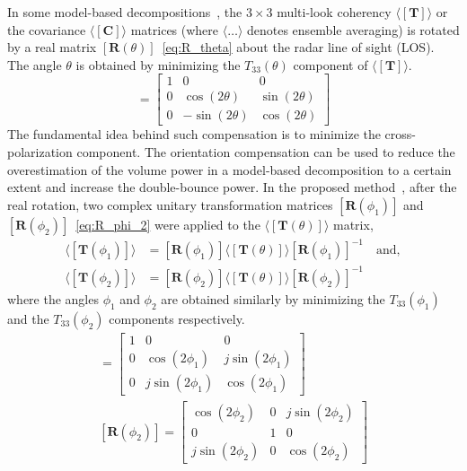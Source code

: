 In some model-based decompositions~\cite{Arii11,An10,YAMAGUCHI2011,Lee2011,singh13,Chen14,Bhattacharya15_SD_Y4O}, the $3\times3$ multi-look coherency $\mathbf{\langle[T]\rangle}$ or the covariance $\mathbf{\langle[C]\rangle}$ matrices (where $\langle\dots\rangle$ denotes ensemble averaging) is rotated by a real matrix $[{\mathbf{R}}(\theta)]$~\eqref{eq:R_theta} about the radar line of sight (LOS). The angle $\theta$ is obtained by minimizing the $T_{33}(\theta)$ component of $\mathbf{\langle[T]\rangle}$. 
\begin{equation}
[{\mathbf{R}}(\theta)] = \left[ \begin{array}{ccc}
1 &0 & 0 \\
0 & \cos(2\theta) & \sin(2\theta) \\
0 & -\sin(2\theta) & \cos(2\theta)
\end{array}\right] 
\label{eq:R_theta} 
\end{equation}
The fundamental idea behind such compensation is to minimize the cross-polarization component. The orientation compensation can be used to reduce the overestimation of the volume power in a model-based decomposition to a certain extent and increase the double-bounce power. 
In the proposed method~\cite{Bhattacharya15}, after the real rotation, two complex unitary transformation matrices $[{\mathbf{R}}(\phi_1)]$ and $[{\mathbf{R}}(\phi_2)]$~\eqref{eq:R_phi_2} were applied to the $\langle[{\mathbf{T}}(\theta)]\rangle$ matrix,
\begin{align*}
\langle[{\mathbf{T}}(\phi_1)]\rangle&=[{\mathbf{R}}(\phi_1)]\langle[{\mathbf{T}}(\theta)]\rangle[{\mathbf{R}}(\phi_1)]^{-1} \quad \mbox{and},\\[0.4em] 
\langle[{\mathbf{T}}(\phi_2)]\rangle&=[{\mathbf{R}}(\phi_2)]\langle[{\mathbf{T}}(\theta)]\rangle[{\mathbf{R}}(\phi_2)]^{-1}
\end{align*}
where the angles $\phi_{1}$ and $\phi_{2}$ are obtained similarly by minimizing the  $T_{33}(\phi_{1})$ and the $T_{33}(\phi_{2})$ components respectively. 
\begin{gather}
[{\mathbf{R}}(\phi_1)] = \left[ \begin{array}{ccc}
1 & 0 & 0 \\
0 & \cos(2\phi_1) & j\sin(2\phi_1) \\
0 & j\sin(2\phi_1) & \cos(2\phi_1)
\end{array}\right] \label{eq:R_phi_1} \\[0.5em] 
[{\mathbf{R}}(\phi_2)] = \left[ \begin{array}{ccc}
\cos(2\phi_2) & 0 & j\sin(2\phi_2) \\
0 & 1 & 0 \\
j\sin(2\phi_2) & 0 & \cos(2\phi_2)
\end{array}\right] 
\label{eq:R_phi_2}
\end{gather}

